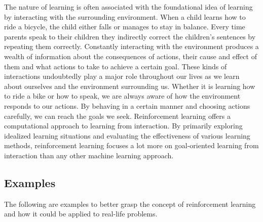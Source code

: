 \documentclass[titlepage]{article}
\begin{document}
\vskip 0.3cm

The nature of learning is often associated with the foundational idea of learning by interacting with the surrounding environment. When a child learns how to ride a bicycle, the child either falls or manages to stay in balance. Every time parents speak to their children they indirectly correct the children's sentences by repeating them correctly. Constantly interacting with the environment produces a wealth of information about the consequences of actions, their cause and effect of them and what actions to take to achieve a certain goal. These kinds of interactions undoubtedly play a major role throughout our lives as we learn about ourselves and the environment surrounding us. Whether it is learning how to ride a bike or how to speak, we are always aware of how the environment responds to our actions. By behaving in a certain manner and choosing actions carefully, we can reach the goals we seek. Reinforcement learning \cite{sutton} offers a computational approach to learning from interaction. By primarily exploring idealized learning situations and evaluating the effectiveness of various learning methods, reinforcement learning focuses a lot more on goal-oriented learning from interaction than any other machine learning approach. 

\subsection{Examples}

\vskip 0.3cm

The following are examples to better grasp the concept of reinforcement learning and how it could be applied to real-life problems.

\vskip 0.3cm
\end{document}
